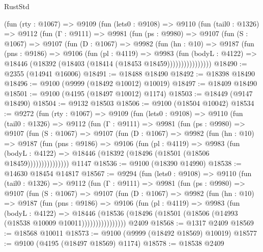 \begin{lexlean}{RustStd}
\begin{coremodule}
      (fun (rty : @1067) =>
      @9109
        (fun (lets0 : @9108) =>
        @9110
          (fun (tail0 : @1326) =>
          @9112
            (fun (Γ : @9111) =>
            @9981
              (fun (ps : @9980) =>
              @9107
                (fun (S : @1067) =>
                @9107
                  (fun (D : @1067) =>
                  @9982
                    (fun (hn : @10) =>
                    @9187
                      (fun (pns : @9186) =>
                      @9106
                        (fun (pl : @4119) =>
                        @9983
                          (fun (bodyL : @4122) =>
                          @18446 (@18392 (@18403 (@18414 (@18453 @18459))))))))))))))))
@18490 := @2355 (@14941 @16006)
@18491 := @18488 @18490
@18492 := @18398 @18490
@18496 := @9100 (@9999 (@18492 @10012) @10019)
@18497 := @18409 @18490
@18501 := @9100 (@4195 (@18497 @10012) @1174)
@18503 := @18449 (@9147 @18490)
@18504 := @9132 @18503
@18506 := @9100 (@18504 @10042)
@18534 := @9272
    (fun (rty : @1067) =>
    @9109
      (fun (lets0 : @9108) =>
      @9110
        (fun (tail0 : @1326) =>
        @9112
          (fun (Γ : @9111) =>
          @9981
            (fun (ps : @9980) =>
            @9107
              (fun (S : @1067) =>
              @9107
                (fun (D : @1067) =>
                @9982
                  (fun (hn : @10) =>
                  @9187
                    (fun (pns : @9186) =>
                    @9106
                      (fun (pl : @4119) =>
                      @9983
                        (fun (bodyL : @4122) =>
                        @18446 (@18392 (@18496 (@18501 (@18506 @18459)))))))))))))))
    @1147
@18536 := @9100 (@18390 @14990)
@18538 := @14630 @18454 @14817
@18567 := @9294
    (fun (lets0 : @9108) =>
    @9110
      (fun (tail0 : @1326) =>
      @9112
        (fun (Γ : @9111) =>
        @9981
          (fun (ps : @9980) =>
          @9107
            (fun (S : @1067) =>
            @9107
              (fun (D : @1067) =>
              @9982
                (fun (hn : @10) =>
                @9187
                  (fun (pns : @9186) =>
                  @9106
                    (fun (pl : @4119) =>
                    @9983
                      (fun (bodyL : @4122) =>
                      @18446
                        (@18536
                          (@18496 (@18501 (@18506 (@14993 (@18538 @10009 @10011))))))))))))))))
    @2409
@18568 := @1317 @2409
@18569 := @18568 @10011
@18573 := @9100 (@9999 (@18492 @18569) @10019)
@18577 := @9100 (@4195 (@18497 @18569) @1174)
@18578 := @18538 @2409

\end{coremodule}
\end{lexlean}
